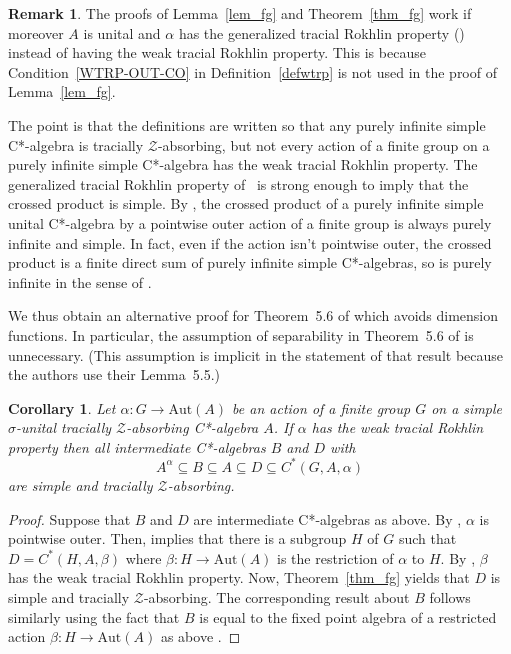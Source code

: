 \documentclass[11pt]{amsart}
\theoremstyle{plain}
\newtheorem{corollary}[theorem]{Corollary}
\theoremstyle{definition}
\newtheorem{remark}[theorem]{Remark}
\theoremstyle{remark}
\numberwithin{equation}{section}
\begin{document}
\begin{remark}\label{rmk_fg}
The proofs of Lemma~\ref{lem_fg} and Theorem~\ref{thm_fg}
work
if moreover $A$ is unital and
$\alpha$ has the generalized tracial Rokhlin property
(\cite[Definition~5.2]{HO13})
instead of having the weak tracial Rokhlin property.
This is because Condition~\eqref{WTRP-OUT-CO}
in Definition~\ref{defwtrp} is not used in the proof of
Lemma~\ref{lem_fg}.

The point is that the definitions are written
so that any purely infinite simple C*-algebra
is tracially $\mathcal{Z}$-absorbing,
but not every action of a finite group
on a purely infinite simple C*-algebra
has the weak tracial Rokhlin property.
The generalized tracial Rokhlin property
of~\cite{HO13}
is strong enough to imply that the crossed product is simple.
By \cite[Theorem 4.5]{JngOsk},
the crossed product of a purely infinite simple unital C*-algebra
by a pointwise outer action of a finite group
is always purely infinite and simple.
In fact,
even if the action isn't pointwise outer,
the crossed product is a finite direct sum
of purely infinite simple C*-algebras,
so is purely infinite in the sense of
\cite[Definition 4.1]{KR00}.

We thus obtain an alternative proof for
Theorem~5.6 of \cite{HO13} which avoids dimension functions.
In particular,  the assumption of separability in
Theorem~5.6 of \cite{HO13}
is unnecessary.
(This assumption
is implicit in the statement of that result
because the authors use their Lemma~5.5.)
\end{remark}


\begin{corollary}\label{Cor_intermediate}
Let  $\alpha \colon G \to \mathrm{Aut} (A)$ be an
action of a finite group $G$ on a 
simple $\sigma$-unital  tracially $\mathcal{Z}$-absorbing 
 C*-algebra $A$.
If $\alpha$ has the weak tracial Rokhlin property 
then all intermediate C*-algebras $B$ and $D$ with 
\[
A^{\alpha}  \subseteq B \subseteq A \subseteq D \subseteq C^*(G, A,\alpha)
\]
are   simple and
tracially $\mathcal{Z}$-absorbing.
\end{corollary}

\begin{proof}
Suppose that $B$ and $D$ are intermediate C*-algebras as above.
By \cite[Proposition~3.2]{FG17}, $\alpha$ is pointwise outer.
Then, \cite[Corollary~6.6(1)]{Izumi2002} implies that there is a subgroup $H$ of
$G$ such that  $D=  C^{*} (H, A, \beta)$
where $\beta \colon H \to \mathrm{Aut} (A)$ is the 
restriction of $\alpha$ to $H$.
By \cite[Proposition~4.1]{FG17}, $\beta$ has 
the weak tracial Rokhlin property. Now, 
Theorem~\ref{thm_fg} yields that $D$ is simple
and tracially $\mathcal{Z}$-absorbing.
The corresponding result about $B$ follows similarly using
the fact that $B$ is equal  to the fixed point
algebra of a restricted action $\beta \colon H \to \mathrm{Aut} (A)$
as above \cite[Corollary~6.6(2)]{Izumi2002}.
\end{proof}
\end{document}
